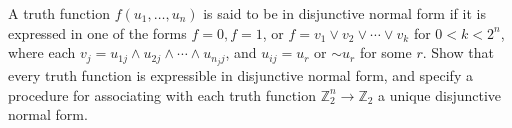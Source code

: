 A truth function $f(u_1, \ldots, u_n)$ is said to be in disjunctive normal form if it is expressed in one of the forms $f = 0, f = 1$, or $f = v_1 \lor v_2 \lor \cdots \lor v_k$ for $0 < k < 2^n$, where each $v_j = u_{1j} \land u_{2j} \land \cdots \land u_{n_j j}$, and $u_{ij} = u_r$ or $\sim u_r$ for some $r$. Show that every truth function is expressible in disjunctive normal form, and specify a procedure for associating with each truth function $\mathbb{Z}_2^n \to \mathbb{Z}_2$ a unique disjunctive normal form.
